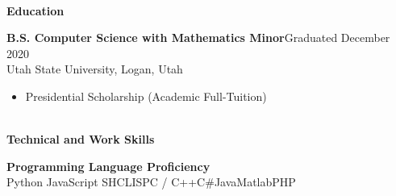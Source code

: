 \documentclass[letterpaper,11pt]{article}
\begin{document}

\begin{Large}\textbf{\\Education}\end{Large}


\textbf{B.S. Computer Science with Mathematics Minor}\hfill Graduated December 2020\\
Utah State University, Logan, Utah%
\begin{itemize}[noitemsep,topsep=0pt]
	\item Presidential Scholarship (Academic Full-Tuition)
\end{itemize}




\begin{Large}\textbf{\\Technical and Work Skills}\end{Large}

\textbf{Programming Language Proficiency} \\
Python \hfill JavaScript \hfill SH\hfill CLISP\hfill C / C++\hfill C\#\hfill Java\hfill Matlab\hfill PHP\\
\end{document}
